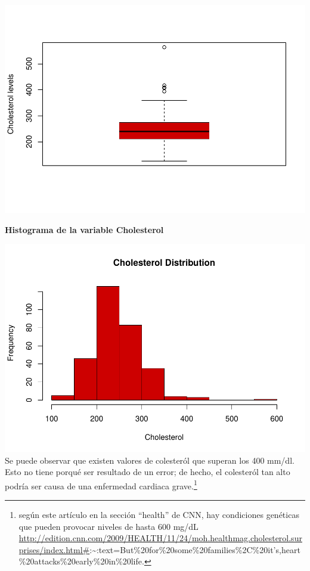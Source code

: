 \documentclass[
]{article}
\newenvironment{Shaded}{\begin{snugshade}}{\end{snugshade}}
\newcommand{\AttributeTok}[1]{\textcolor[rgb]{0.13,0.29,0.53}{#1}}
\newcommand{\FunctionTok}[1]{\textcolor[rgb]{0.13,0.29,0.53}{\textbf{#1}}}
\newcommand{\NormalTok}[1]{#1}
\newcommand{\SpecialCharTok}[1]{\textcolor[rgb]{0.81,0.36,0.00}{\textbf{#1}}}
\newcommand{\StringTok}[1]{\textcolor[rgb]{0.31,0.60,0.02}{#1}}
\begin{document}
\includegraphics{PRA2_files/figure-latex/unnamed-chunk-5-1.pdf}

\textbf{Histograma de la variable Cholesterol}

\begin{Shaded}
\end{Shaded}

\includegraphics{PRA2_files/figure-latex/unnamed-chunk-6-1.pdf} Se puede
observar que existen valores de colesteról que superan los 400 mm/dl.
Esto no tiene porqué ser resultado de un error; de hecho, el colesteról
tan alto podría ser causa de una enfermedad cardiaca grave.\footnote{según
  este artículo en la sección ``health'' de CNN, hay condiciones
  genéticas que pueden provocar niveles de hasta 600 mg/dL
  \url{http://edition.cnn.com/2009/HEALTH/11/24/moh.healthmag.cholesterol.surprises/index.html\#}:\textasciitilde:text=But\%20for\%20some\%20families\%2C\%20it's,heart\%20attacks\%20early\%20in\%20life.}
\end{document}
